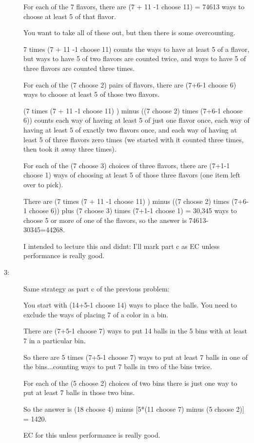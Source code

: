 \documentclass[12pt]{article}
\begin{document}
\begin{description}
For each of the 7 flavors, there are (7 + 11 -1 choose 11) = 74613 ways to choose at least 5 of that flavor.

You want to take all of these out, but then there is some overcounting.

7 times (7 + 11 -1 choose 11) counts the ways to have at least 5 of a flavor, but ways to have
5 of two flavors are counted twice, and ways to have 5 of three flavors are counted three times.

For each of the (7 choose 2) pairs of flavors, there are (7+6-1 choose 6) ways to choose at least 5 of those two flavors.

(7 times (7 + 11 -1 choose 11) ) minus ((7 choose 2) times  (7+6-1 choose 6))  counts each way of having at least 5 of just one flavor once, each way of having at least 5 of exactly two flavors once, and each way of having at least 5 of three flavors zero times (we started with it counted three times, then took it away three times).

For each of the (7 choose 3) choices of three flavors, there are (7+1-1 choose 1) ways of choosing at least 5 of those three flavors (one item left over to pick).

There are  (7 times (7 + 11 -1 choose 11) ) minus ((7 choose 2) times  (7+6-1 choose 6)) plus (7 choose 3) times (7+1-1 choose 1) = 30,345 ways to choose 5 or more of one of the flavors, so the answer is 74613-30345=44268.

I intended to lecture this and didnt:  I'll mark part c as EC unless performance is really good.

\item[3:]  Same strategy as part c of the previous problem:  

You start with (14+5-1 choose 14) ways to place the balls.  You need to exclude the ways of placing 7 of a color in a bin.

There are (7+5-1 choose 7) ways to put 14 balls in the 5 bins with at least 7 in a particular bin.

So there are 5 times (7+5-1 choose 7)  ways to put at least 7 balls in one of the bins...counting ways to put 7 balls in two of the bins twice.

For each of the (5 choose 2) choices of two bins there is just one way to put at least 7 balls in those two bins.

So the answer is (18 choose 4) minus [5*(11 choose 7) minus (5 choose 2)] = 1420.

EC for this unless performance is really good.



\end{description}
\end{document}
